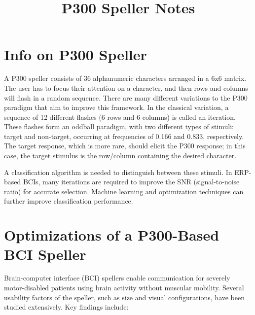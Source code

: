\documentclass{article}
\title{P300 Speller Notes}
\author{}
\date{}
\begin{document}
\maketitle

\section{Info on P300 Speller}
A P300 speller consists of 36 alphanumeric characters arranged in a 6x6 matrix. The user has to focus their attention on a character, and then rows and columns will flash in a random sequence. There are many different variations to the P300 paradigm that aim to improve this framework. In the classical variation, a sequence of 12 different flashes (6 rows and 6 columns) is called an iteration. These flashes form an oddball paradigm, with two different types of stimuli: target and non-target, occurring at frequencies of 0.166 and 0.833, respectively. The target response, which is more rare, should elicit the P300 response; in this case, the target stimulus is the row/column containing the desired character. 

A classification algorithm is needed to distinguish between these stimuli. In ERP-based BCIs, many iterations are required to improve the SNR (signal-to-noise ratio) for accurate selection. Machine learning and optimization techniques can further improve classification performance.

\section{Optimizations of a P300-Based BCI Speller}
Brain-computer interface (BCI) spellers enable communication for severely motor-disabled patients using brain activity without muscular mobility. Several usability factors of the speller, such as size and visual configurations, have been studied extensively. Key findings include:
\end{document}
